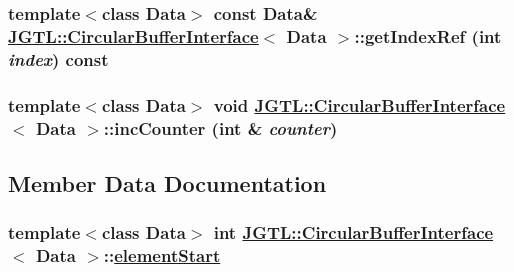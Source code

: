 \hypertarget{class_j_g_t_l_1_1_circular_buffer_interface_526ca43f4de0be8d85f5109cee59ebd1}{
\subsubsection[getIndexRef]{\setlength{\rightskip}{0pt plus 5cm}template$<$class Data$>$ const Data\& \hyperlink{class_j_g_t_l_1_1_circular_buffer_interface}{JGTL::Circular\-Buffer\-Interface}$<$ Data $>$::get\-Index\-Ref (int {\em index}) const}}
\label{class_j_g_t_l_1_1_circular_buffer_interface_526ca43f4de0be8d85f5109cee59ebd1}


\hypertarget{class_j_g_t_l_1_1_circular_buffer_interface_e16b6f41d64ab1d0910963aca895aeac}{
\subsubsection[incCounter]{\setlength{\rightskip}{0pt plus 5cm}template$<$class Data$>$ void \hyperlink{class_j_g_t_l_1_1_circular_buffer_interface}{JGTL::Circular\-Buffer\-Interface}$<$ Data $>$::inc\-Counter (int \& {\em counter})}}
\label{class_j_g_t_l_1_1_circular_buffer_interface_e16b6f41d64ab1d0910963aca895aeac}




\subsection{Member Data Documentation}
\hypertarget{class_j_g_t_l_1_1_circular_buffer_interface_e12ae36ffa557c4ea92619e1c9c50651}{
\subsubsection[elementStart]{\setlength{\rightskip}{0pt plus 5cm}template$<$class Data$>$ int \hyperlink{class_j_g_t_l_1_1_circular_buffer_interface}{JGTL::Circular\-Buffer\-Interface}$<$ Data $>$::\hyperlink{class_j_g_t_l_1_1_circular_buffer_interface_e12ae36ffa557c4ea92619e1c9c50651}{element\-Start}}}
\label{class_j_g_t_l_1_1_circular_buffer_interface_e12ae36ffa557c4ea92619e1c9c50651}


